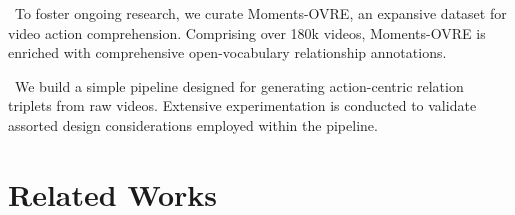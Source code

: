 \documentclass[letterpaper]{article}
\begin{document}
\textbullet \ To foster ongoing research, we curate Moments-OVRE, an expansive dataset for video action comprehension. Comprising over 180k videos, Moments-OVRE is enriched with comprehensive open-vocabulary relationship annotations.

\textbullet \ We build a simple pipeline designed for generating action-centric relation triplets from raw videos. Extensive experimentation is conducted to validate assorted design considerations employed within the pipeline.


\section{Related Works} 











\end{document}
